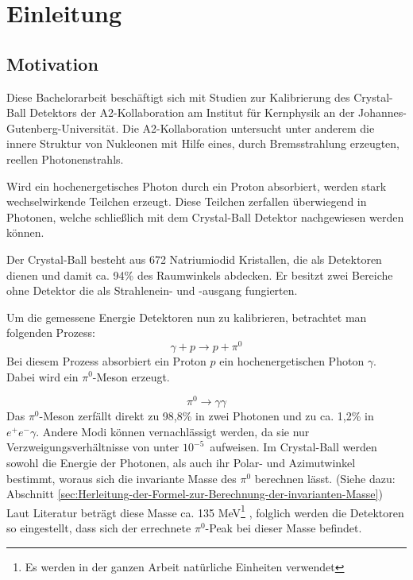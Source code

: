 \documentclass[a4paper,11pt,oneside,final,german,openbib,pdftex]{scrbook}
\begin{document}
\mainmatter
\sloppy

\chapter{Einleitung}

\section{Motivation}
{
	Diese Bachelorarbeit beschäftigt sich mit Studien zur Kalibrierung des Crystal-Ball Detektors der A2-Kollaboration am Institut für Kernphysik an der Johannes-Gutenberg-Universität.
	Die A2-Kollaboration untersucht unter anderem die innere Struktur von Nukleonen mit Hilfe eines, durch Bremsstrahlung erzeugten, reellen Photonenstrahls. 
	
	Wird ein hochenergetisches Photon durch ein Proton absorbiert, werden stark wechselwirkende Teilchen erzeugt. Diese Teilchen zerfallen überwiegend in Photonen, welche schließlich mit dem Crystal-Ball Detektor nachgewiesen werden können. 
	
	Der Crystal-Ball besteht aus 672 Natriumiodid Kristallen, die als Detektoren dienen und damit ca. 94\% des Raumwinkels abdecken.
	Er besitzt zwei Bereiche ohne Detektor die als Strahlenein- und -ausgang fungierten.
	
	Um die gemessene Energie Detektoren nun zu kalibrieren, betrachtet man folgenden Prozess:
\begin{equation}
	\gamma + p \rightarrow p + \pi^0
	\label{eq.gammascattering}
\end{equation} 
Bei diesem Prozess absorbiert ein Proton $p$ ein hochenergetischen Photon $\gamma$. Dabei wird ein $\pi^0$-Meson erzeugt.

	\begin{equation}
		\pi^0\rightarrow \gamma \gamma
		\label{eq.pi0decay}
	\end{equation}
Das $\pi^0$-Meson zerfällt direkt zu 98,8\% in zwei Photonen und zu ca. 1,2\% in $e^+e^- \gamma$. Andere Modi können vernachlässigt werden, da sie nur Verzweigungsverh\"altnisse von unter $10^{-5}$\ aufweisen. Im Crystal-Ball werden sowohl die Energie der Photonen, als auch ihr Polar- und Azimutwinkel bestimmt, woraus sich die invariante Masse des $\pi^0$ berechnen lässt. (Siehe dazu: Abschnitt \ref{sec:Herleitung-der-Formel-zur-Berechnung-der-invarianten-Masse})
Laut Literatur betr\"agt diese Masse ca. 135 MeV\footnote{Es werden in der ganzen Arbeit nat\"urliche Einheiten verwendet} \cite{PDG16}, folglich werden die Detektoren so eingestellt, dass sich der errechnete $\pi^0$-Peak bei dieser Masse befindet. 

}
\end{document}
